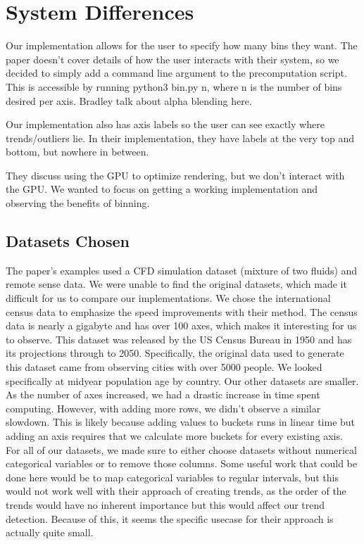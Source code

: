 \documentclass[	DIV=calc,%
			paper=a4,%
			fontsize=11pt,%
			twocolumn]{scrartcl}					%
\begin{document}
\section {System Differences}
Our implementation allows for the user to specify how many bins they want. The paper doesn't cover details of how the user interacts with their system, so we decided to simply add a command line argument to the precomputation script. This is accessible by running python3 bin.py n, where n is the number of bins desired per axis. 
Bradley talk about alpha blending here. 

Our implementation also has axis labels so the user can see exactly where trends/outliers lie. In their implementation,
they have labels at the very top and bottom, but nowhere in between. 

They discuss using the GPU to optimize rendering, but we don't interact with the GPU. We wanted to focus on 
getting a working implementation and observing the benefits of binning. 


\subsection {Datasets Chosen}
The paper's examples used a CFD simulation dataset (mixture of two fluids) and remote sense data. We were unable to find the original datasets, which made it difficult for us to compare our implementations. 
We chose the international census data to emphasize the speed improvements with their method. The census data is nearly a gigabyte and has over 100 axes, which makes it interesting for us to observe. This dataset was released by the US Census Bureau in 1950 and has its projections through to 2050. Specifically, the original data used to generate this dataset came from observing cities with over 5000 people. We looked specifically at midyear population age by country. 
Our other datasets are smaller. As the number of axes increased, we had a drastic increase in time spent computing. However, with adding more rows, we didn't observe a similar slowdown. This is likely because adding values to buckets runs in linear time but adding an axis requires that we calculate more buckets for every existing axis. \\

For all of our datasets, we made sure to either choose datasets without numerical categorical variables or to remove those columns. Some useful work that could be done here would be to
map categorical variables to regular intervals, but this would not work well with their approach of creating trends, as the order of the trends would have no inherent importance
but this would affect our trend detection. Because of this, it seems the specific usecase for their approach is actually quite small. 
\end{document}
